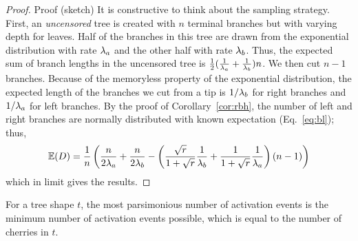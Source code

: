 \begin{proof}{Proof (sketch)}
It is constructive to think about the sampling strategy. First, an \textit{uncensored} tree is created with $n$ terminal branches but with varying depth for leaves. Half of the branches in this tree are drawn from the exponential distribution with rate $\lambda_a$ and the other half with rate $\lambda_b$. Thus, the expected sum of branch lengths in the uncensored tree is $\frac{1}{2}(\frac{1}{\lambda_a}+\frac{1}{\lambda_b})n$. We then cut $n-1$ branches. Because of the memoryless property of the exponential distribution, the expected length of the branches we cut from a tip is $1/\lambda_b$ for right branches and $1/\lambda_a$ for left branches. By the proof of Corollary~\ref{cor:rbh}, the number of left and right branches are normally distributed with known expectation (Eq.~\ref{eq:bl}); thus,
$$
\mathbb{E}(D)=
\frac{1}{n}\left(\frac{n}{2\lambda_a}+\frac{n}{2\lambda_b}-\left(\frac{\sqrt{r}}{1+\sqrt{r}}\frac{1}{\lambda_b}+\frac{1}{1+\sqrt{r}}\frac{1}{\lambda_a}\right)(n-1)\right)
$$
which in limit gives the results. 
\end{proof}

\begin{lemma}\label{cherryparsimony}
For a tree shape $t$, the most parsimonious number of activation events is the minimum number of activation events possible, which is equal to the number of cherries in $t$.
\end{lemma}

